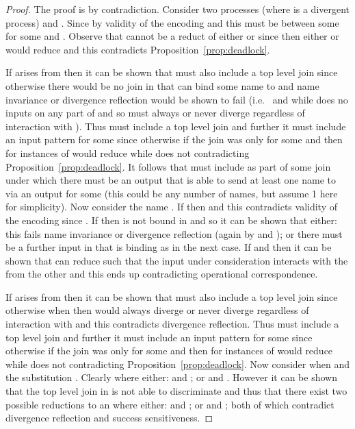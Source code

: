\documentclass[submission,copyright,creativecommons]{eptcs}
\begin{document}
\begin{proof}
The proof is by contradiction. Consider two processes
 (where  is a divergent process) and .
Since  by validity of the encoding  and this must be
between some  for some  and . 
Observe that  cannot be a reduct of either  or  since then
either  or  would reduce and this contradicts Proposition~\ref{prop:deadlock}.

If  arises from  then it can be shown that  must also include a top level
join since otherwise there would be no join in  that can bind some name to  and
name invariance or divergence reflection would be shown to fail
(i.e.~ and  while
 does no inputs on any part of 
and so must always or never diverge regardless of interaction with ).
Thus  must include a top level join and further it must include an input pattern
 for some  since otherwise if the join was only
 for some  and  then
 for  instances of  would reduce while 
does not contradicting Proposition~\ref{prop:deadlock}.
It follows that  must include  as part of some join under which there
must be an output that is able to send at least one name to  via an output  for some 
(this could be any number of names, but assume 1 here for simplicity).
Now consider the name .
If  then  and this contradicts validity of the encoding since .
If  then  is not bound in  and so it can be shown that either: this fails name invariance
or divergence reflection
(again by  and );
or there must be a further input in  that is binding as in the next case.
If  and  then it can be shown that  can reduce such that the
input under consideration interacts with the  from the other 
and this ends up contradicting operational correspondence.

If  arises from  then it can be shown that  must also include a top level
join since otherwise when  then  would always diverge or never diverge 
regardless of interaction with  and this contradicts divergence reflection.
Thus  must include a top level join and further it must include an input pattern
 for some  since otherwise if the join was only
 for some  and  then
 for  instances of  would reduce while 
does not contradicting Proposition~\ref{prop:deadlock}.
Now consider when  and the substitution .
Clearly  where either:
 and ; or  and .
However it can be shown that the top level join in  is not able to discriminate and
thus that there exist two possible reductions  to an 
where either:
 and ; or  and ;
both of which contradict divergence reflection and success sensitiveness.
\end{proof}
\end{document}
